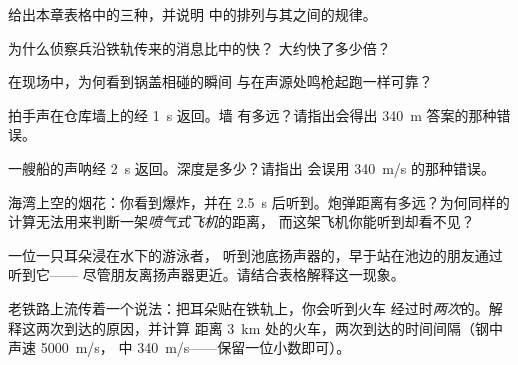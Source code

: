 \begin{exercise}[$\star$]\label{exo:g7:sound-production:4}
给出本章表格中的三种，并说明
中的排列与其之间的规律。
\end{exercise}

\begin{exercise}[$\star$]\label{exo:g7:sound-production:5}
为什么侦察兵沿铁轨传来的消息比中的快？
大约快了多少倍？
\end{exercise}

\begin{exercise}[$\star$]\label{exo:g7:sound-production:6}
在现场中，为何看到锅盖相碰的瞬间
与在声源处鸣枪起跑一样可靠？
\end{exercise}

\begin{exercise}[$\star$]\label{exo:g7:sound-production:7}
拍手声在仓库墙上的经 \qty{1}{s} 返回。墙
有多远？请指出会得出
\qty{340}{m} 答案的那种错误。
\end{exercise}

\begin{exercise}[$\star$]\label{exo:g7:sound-production:8}
一艘船的声呐经 \qty{2}{s} 返回。深度是多少？请指出
会误用 \qty{340}{m/s} 的那种错误。
\end{exercise}

\begin{exercise}[$\star\star$]\label{exo:g7:sound-production:9}
海湾上空的烟花：你看到爆炸，并在
\qty{2.5}{s} 后听到。炮弹距离有多远？为何同样的
计算无法用来判断一架\emph{喷气式飞机}的距离，
而这架飞机你能听到却看不见？
\end{exercise}

\begin{exercise}[$\star\star$]\label{exo:g7:sound-production:10}
一位一只耳朵浸在水下的游泳者，
听到池底扬声器的，早于站在池边的朋友通过听到它——
尽管朋友离扬声器更近。请结合表格解释这一现象。
\end{exercise}

\begin{exercise}[$\star\star$]\label{exo:g7:sound-production:11}
老铁路上流传着一个说法：把耳朵贴在铁轨上，你会听到火车
经过时\emph{两次}的。解释这两次到达的原因，并计算
距离 \qty{3}{km} 处的火车，两次到达的时间间隔（钢中声速 \qty{5000}{m/s}，
中 \qty{340}{m/s}——保留一位小数即可）。
\end{exercise}

